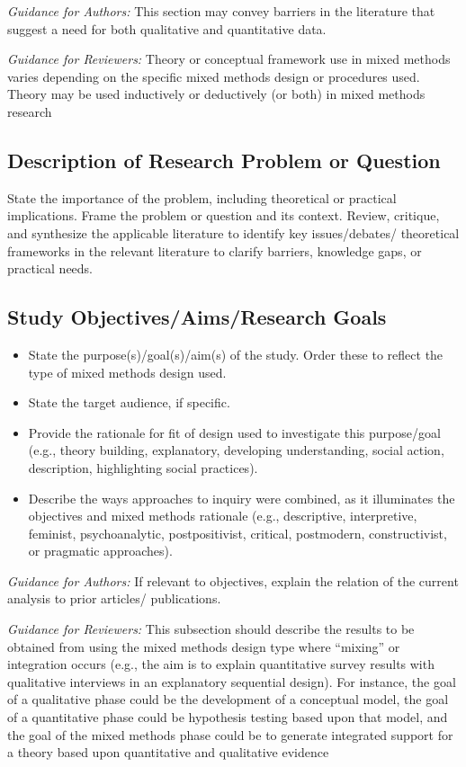 \documentclass[acmsmall]{acmart}
\begin{document}
\textit{Guidance for Authors:} This section may convey barriers in the literature that suggest a need for both qualitative and quantitative data.

\textit{Guidance for Reviewers:} Theory or conceptual framework use in mixed methods varies depending on the  specific mixed methods design or procedures used. Theory may be used inductively or deductively (or both) in mixed methods research

\subsection{Description of Research Problem or Question}

State the importance of the problem, including theoretical or practical implications. Frame the problem or question and its context. Review, critique, and synthesize the applicable literature to identify key issues/debates/ theoretical frameworks in the relevant literature to clarify barriers, knowledge gaps, or practical needs.

\subsection{Study Objectives/Aims/Research Goals}
\begin{itemize}
\item State the purpose(s)/goal(s)/aim(s) of the study. Order these to reflect the type of mixed methods design used.
\item State the target audience, if specific.
\item Provide the rationale for fit of design used to investigate this purpose/goal (e.g., theory building, explanatory, developing understanding, social action, description, highlighting social practices).
\item Describe the ways approaches to inquiry were combined, as it illuminates the objectives and mixed methods rationale (e.g., descriptive, interpretive, feminist, psychoanalytic, postpositivist, critical, postmodern, constructivist, or pragmatic approaches).
\end{itemize}

\textit{Guidance for Authors:} If relevant to objectives, explain the relation of the current analysis to prior articles/ publications.

\textit{Guidance for Reviewers:} This subsection should describe the results to be obtained from using the mixed methods design type where “mixing” or integration occurs (e.g., the aim is to explain quantitative survey results with qualitative interviews in an explanatory sequential design). For instance, the goal of a qualitative phase could be the development of a conceptual model, the goal of a quantitative phase could be hypothesis testing based upon that model, and the goal of the mixed methods phase could be to generate integrated support for a theory based upon quantitative and qualitative evidence
\end{document}
